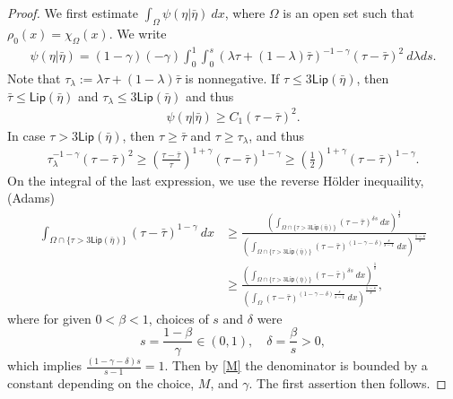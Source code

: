 \documentclass[10pt, letterpaper]{article}
\def\Lip{{\textsf{Lip}}}
\theoremstyle{definition}
\theoremstyle{remark}
\begin{document}
\begin{proof}
We first estimate $\int_\Omega \psi(\eta|\bar\eta) \:dx$, where $\Omega$ is an open set such that $\rho_0(x) = \chi_\Omega(x)$. We write
\begin{align*}
 \psi(\eta|\bar\eta) = (1-\gamma)(-\gamma)\int_0^1\int_0^s (\lambda \tau + (1-\lambda) \bar\tau)^{-1-\gamma} (\tau - \bar\tau)^2 \:d\lambda ds.
\end{align*}
Note that $\tau_\lambda:=\lambda \tau + (1-\lambda)\bar\tau$ is nonnegative. If $\tau \le 3\Lip(\bar\eta)$, then $\bar\tau \le \Lip(\bar\eta)$ and $\tau_\lambda \le 3\Lip(\bar\eta)$ and thus
\begin{align*}
 \psi(\eta|\bar\eta) \ge C_1 (\tau - \bar\tau)^2.
\end{align*}
In case $\tau > 3\Lip(\bar\eta)$, then $\tau\ge\bar\tau$ and $\tau\ge \tau_\lambda$, and thus
\begin{align*}
 \tau_\lambda^{-1-\gamma}(\tau-\bar\tau)^2 
\ge \left(\frac{\tau-\bar\tau}{\tau}\right)^{1+\gamma} (\tau-\bar\tau)^{1-\gamma} \ge \left( \frac{1}{2} \right)^{1+\gamma} (\tau-\bar\tau)^{1-\gamma}.
\end{align*}
On the integral of the last expression, we use the reverse H\"older inequaility, (Adams)
\begin{align*}
 \int_{\Omega \cap \{\tau>3\Lip(\bar\eta)\}} (\tau-\bar\tau)^{1-\gamma} \:dx 
 &\ge \frac{\left(\int_{\Omega \cap \{\tau>3\Lip(\bar\eta)\}} (\tau-\bar\tau)^{\delta s} \:dx \right)^{\frac{1}{s}}}{\left(\int_{\Omega \cap \{\tau>3\Lip(\bar\eta)\}} (\tau-\bar\tau)^{(1-\gamma-\delta) \frac{s}{s-1}} \:dx \right)^{\frac{1-s}{s}}}\\
 & \ge \frac{\left(\int_{\Omega \cap \{\tau>3\Lip(\bar\eta)\}} (\tau-\bar\tau)^{\delta s} \:dx \right)^{\frac{1}{s}}}{\left(\int_{\Omega} (\tau-\bar\tau)^{(1-\gamma-\delta) \frac{s}{s-1}} \:dx \right)^{\frac{1-s}{s}}},
\end{align*}
where for given $0<\beta <1$, choices of $s$ and $\delta$ were 
$$s = \frac{1-\beta}{\gamma} \in (0,1), \quad \delta = \frac{\beta}{s}>0,$$
which implies $\frac{(1-\gamma-\delta)s}{s-1} = 1$. Then by \eqref{M} the denominator is bounded by a constant depending on the choice, $M$, and $\gamma$. The first assertion then follows.


\end{proof}
\end{document}

